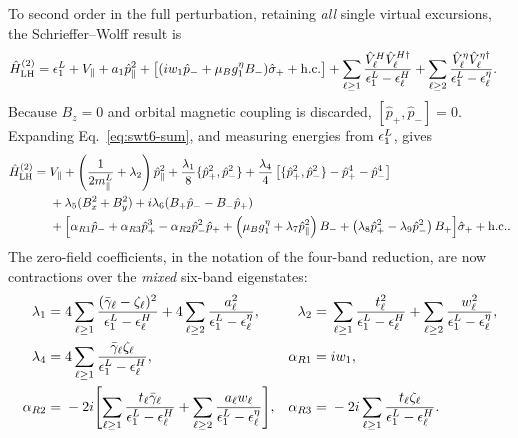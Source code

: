 To second order in the full perturbation, retaining \emph{all} single
virtual excursions, the Schrieffer--Wolff result is
\begin{equation}
 \begin{aligned}
 \hat H_{\mathrm{LH}}^{(2)}={}&\epsilon_ 1^L+V_\parallel
 +a_1\hat p_\parallel^2
 +\bigl[(iw_1 \hat{p}_ -+\mu_Bg_1^\eta B_-)\hat\sigma_+ +\mathrm{h.c.}\bigr]
 +\sum_{\ell\ge1}\frac{\hat V_\ell^H\hat V_\ell^{H\dagger}}
 {\epsilon_ 1^L-\epsilon_ \ell^H}
 +\sum_{\ell\ge2}\frac{\hat V_\ell^\eta\hat V_\ell^{\eta\dagger}}
 {\epsilon_ 1^L-\epsilon_ \ell^\eta}.
 \end{aligned}
 \label{eq:swt6-sum}
\end{equation}
Because $B_z=0$ and orbital magnetic coupling is discarded,
$[ \hat{p}_ +, \hat{p}_ -]=0$. Expanding Eq.~\eqref{eq:swt6-sum}, and measuring
energies from $\epsilon_ 1^L$, gives
\begin{align}
\hat H_{\mathrm{LH}}^{(2)}={}&V_\parallel
+\left(\frac{1}{2m_\parallel^L}+\lambda_2\right)\hat p_\parallel^2
+\frac{\lambda_1}{8}\{\hat p_+^2,\hat p_-^2\}
+\frac{\lambda_4}{4}
\left[\{\hat p_+^2,\hat p_-^2\}-\hat p_+^4-\hat p_-^4\right]
\nonumber\\
&+\lambda_5(B_x^2+B_y^2)
+i\lambda_6(B_+\hat p_- - B_-\hat p_+)
\nonumber\\
&+\Bigl[
\alpha_{R1}\hat p_-
+\alpha_{R3}\hat p_+^3
-\alpha_{R2}\hat p_-^2\hat p_+
+\left(\mu_B g_1^\eta+\lambda_7\hat p_\parallel^2\right)B_-
+\left(\lambda_8\hat p_+^2-\lambda_9\hat p_-^2\right)B_+
\Bigr]\hat\sigma_++\mathrm{h.c.}.
\label{eq:swt6-Heff}
\end{align}
The zero-field coefficients, in the notation of the four-band reduction,
are now contractions over the \emph{mixed} six-band eigenstates:
\begin{align}
 \lambda_1={}&4\sum_{\ell\ge1}
 \frac{(\bar\gamma_\ell-\zeta_\ell)^2}{\epsilon_ 1^L-\epsilon_ \ell^H}
 +4\sum_{\ell\ge2}\frac{a_\ell^2}{\epsilon_ 1^L-\epsilon_ \ell^\eta},
 &\lambda_2={}&\sum_{\ell\ge1}
 \frac{t_\ell^2}{\epsilon_ 1^L-\epsilon_ \ell^H}
 +\sum_{\ell\ge2}\frac{w_\ell^2}{\epsilon_ 1^L-\epsilon_ \ell^\eta},\nonumber\\
 \lambda_4={}&4\sum_{\ell\ge1}
 \frac{\bar\gamma_\ell\zeta_\ell}{\epsilon_ 1^L-\epsilon_ \ell^H},
 &\alpha_{R1}={}&iw_1,\nonumber\\
 \alpha_{R2}={}&-2i\Biggl[
 \sum_{\ell\ge1}\frac{t_\ell\bar\gamma_\ell}{\epsilon_ 1^L-\epsilon_ \ell^H}
 +\sum_{\ell\ge2}\frac{a_\ell w_\ell}{\epsilon_ 1^L-\epsilon_ \ell^\eta}\Biggr],
 &\alpha_{R3}={}&-2i\sum_{\ell\ge1}
 \frac{t_\ell\zeta_\ell}{\epsilon_ 1^L-\epsilon_ \ell^H}.
 \label{eq:swt6-zero-coeff}
\end{align}
